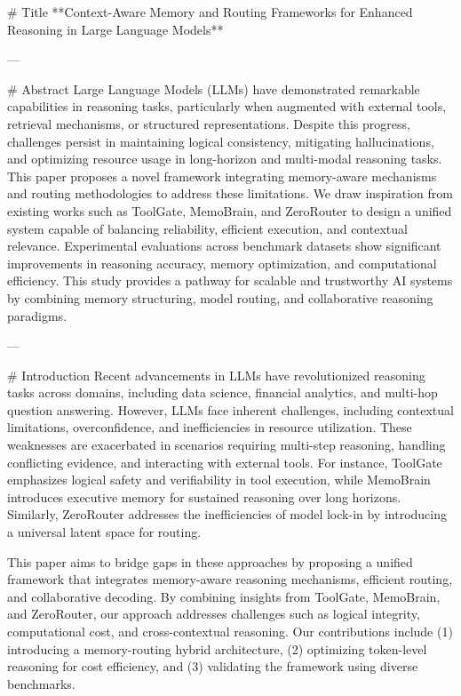 # Title  
**Context-Aware Memory and Routing Frameworks for Enhanced Reasoning in Large Language Models**

---

# Abstract  
Large Language Models (LLMs) have demonstrated remarkable capabilities in reasoning tasks, particularly when augmented with external tools, retrieval mechanisms, or structured representations. Despite this progress, challenges persist in maintaining logical consistency, mitigating hallucinations, and optimizing resource usage in long-horizon and multi-modal reasoning tasks. This paper proposes a novel framework integrating memory-aware mechanisms and routing methodologies to address these limitations. We draw inspiration from existing works such as ToolGate, MemoBrain, and ZeroRouter to design a unified system capable of balancing reliability, efficient execution, and contextual relevance. Experimental evaluations across benchmark datasets show significant improvements in reasoning accuracy, memory optimization, and computational efficiency. This study provides a pathway for scalable and trustworthy AI systems by combining memory structuring, model routing, and collaborative reasoning paradigms.

---

# Introduction  
Recent advancements in LLMs have revolutionized reasoning tasks across domains, including data science, financial analytics, and multi-hop question answering. However, LLMs face inherent challenges, including contextual limitations, overconfidence, and inefficiencies in resource utilization. These weaknesses are exacerbated in scenarios requiring multi-step reasoning, handling conflicting evidence, and interacting with external tools. For instance, ToolGate emphasizes logical safety and verifiability in tool execution, while MemoBrain introduces executive memory for sustained reasoning over long horizons. Similarly, ZeroRouter addresses the inefficiencies of model lock-in by introducing a universal latent space for routing.

This paper aims to bridge gaps in these approaches by proposing a unified framework that integrates memory-aware reasoning mechanisms, efficient routing, and collaborative decoding. By combining insights from ToolGate, MemoBrain, and ZeroRouter, our approach addresses challenges such as logical integrity, computational cost, and cross-contextual reasoning. Our contributions include (1) introducing a memory-routing hybrid architecture, (2) optimizing token-level reasoning for cost efficiency, and (3) validating the framework using diverse benchmarks.

